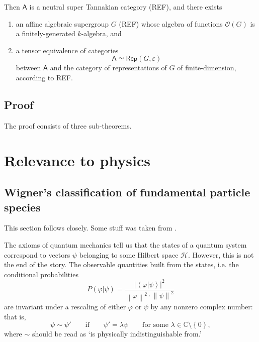 \documentclass[a4paper]{report}
\newcommand{\C}{\mathbb{C}}
\newcommand{\norm}[1]{\left\lVert#1\right\rVert}
\theoremstyle{definition}
\theoremstyle{plain}
\theoremstyle{remark}
\begin{document}
Then $\mathsf{A}$ is a neutral super Tannakian category (REF), and there exists 
\begin{enumerate}
  \item an affine algebraic supergroup $G$ (REF) whose algebra of functions $\mathscr{O}(G)$ is a finitely-generated $k$-algebra, and 

  \item a tensor equivalence of categories
    \begin{equation*}
      \mathsf{A} \simeq \mathsf{Rep}(G, \varepsilon)
    \end{equation*}
    between $\mathsf{A}$ and the category of representations of $G$ of finite-dimension, according to REF.
\end{enumerate}

\section{Proof}
The proof consists of three sub-theorems.

\chapter{Relevance to physics}
\section{Wigner's classification of fundamental particle species}
This section follows \cite{haag-local-quantum-physics} closely. Some stuff was taken from \cite{sexl-urbantke-relativity-groups-particles}.

The axioms of quantum mechanics tell us that the states of a quantum system correspond to vectors $\psi$ belonging to some Hilbert space $\mathscr{H}$. However, this is not the end of the story. The observable quantities built from the states, i.e. the conditional probabilities
\begin{equation*}
  P(\varphi | \psi) = \frac{\left|\left\langle \varphi | \psi \right\rangle\right|^{2}}{\norm{\varphi}^{2} \cdot \norm{\psi}^{2}}
\end{equation*}
are invariant under a rescaling of either $\varphi$ or $\psi$ by any nonzero complex number: that is,
\begin{equation*}
  \psi \sim \psi' \qquad\text{if}\qquad \psi' = \lambda \psi\qquad\text{for some }\lambda \in \C\setminus\left\{ 0 \right\},
\end{equation*}
where $\sim$ should be read as `is physically indistinguishable from.'
\end{document}
